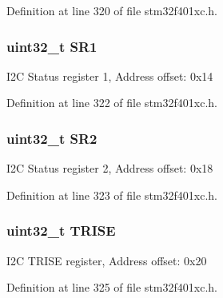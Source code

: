 Definition at line 320 of file stm32f401xc.\+h.

\subsubsection[{\texorpdfstring{S\+R1}{SR1}}]{ uint32\+\_\+t S\+R1}\hypertarget{struct_i2_c___type_def_acefca4fd83c4b7846ae6d3cfe7bb8df9}{}\label{struct_i2_c___type_def_acefca4fd83c4b7846ae6d3cfe7bb8df9}
I2C Status register 1, Address offset\+: 0x14 

Definition at line 322 of file stm32f401xc.\+h.

\subsubsection[{\texorpdfstring{S\+R2}{SR2}}]{ uint32\+\_\+t S\+R2}\hypertarget{struct_i2_c___type_def_a89623ee198737b29dc0a803310605a83}{}\label{struct_i2_c___type_def_a89623ee198737b29dc0a803310605a83}
I2C Status register 2, Address offset\+: 0x18 

Definition at line 323 of file stm32f401xc.\+h.

\subsubsection[{\texorpdfstring{T\+R\+I\+SE}{TRISE}}]{ uint32\+\_\+t T\+R\+I\+SE}\hypertarget{struct_i2_c___type_def_a5d5764c0ec44b661da957e6343f9e7b5}{}\label{struct_i2_c___type_def_a5d5764c0ec44b661da957e6343f9e7b5}
I2C T\+R\+I\+SE register, Address offset\+: 0x20 

Definition at line 325 of file stm32f401xc.\+h.



